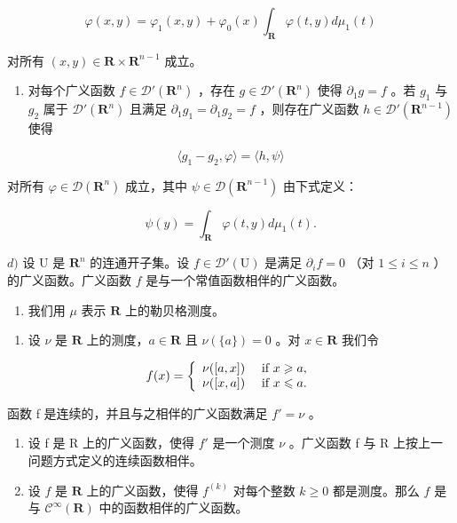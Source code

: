 \[
\varphi (x, y) = \varphi_ {1} (x, y) + \varphi_ {0} (x) \int_ {\mathbf {R}} \varphi (t, y) d \mu_ {1} (t)
\]

对所有 \((x,y)\in \mathbf{R}\times \mathbf{R}^{n - 1}\) 成立。

\begin{enumerate}
\def\labelenumi{\alph{enumi})}
\setcounter{enumi}{2}
\tightlist
\item
  对每个广义函数 \(f \in \mathcal{D}'(\mathbf{R}^{n})\) ，存在 \(g \in \mathcal{D}'(\mathbf{R}^{n})\) 使得 \(\partial_{1}g = f\) 。若 \(g_{1}\) 与 \(g_{2}\) 属于 \(\mathcal{D}'(\mathbf{R}^{n})\) 且满足 \(\partial_{1}g_{1} = \partial_{1}g_{2} = f\) ，则存在广义函数 \(h \in \mathcal{D}'(\mathbf{R}^{n-1})\) 使得
\end{enumerate}

\[
\langle g _ {1} - g _ {2}, \varphi \rangle = \langle h, \psi \rangle
\]

对所有 \(\varphi\in\mathcal{D}(\mathbf{R}^{n})\) 成立，其中 \(\psi\in\mathcal{D}(\mathbf{R}^{n-1})\) 由下式定义：

\[
\psi (y) = \int_ {\mathbf {R}} \varphi (t, y) d \mu_ {1} (t).
\]

\(d)\) 设 U 是 \(\mathbf{R}^{n}\) 的连通开子集。设 \(f \in \mathcal{D}'(\mathrm{U})\) 是满足 \(\partial_{i}f = 0\) （对 \(1 \leqslant i \leqslant n\) ）的广义函数。广义函数 \(f\) 是与一个常值函数相伴的广义函数。

\begin{enumerate}
\def\labelenumi{\arabic{enumi})}
\setcounter{enumi}{3}
\tightlist
\item
  我们用 \(\mu\) 表示 \(\mathbf{R}\) 上的勒贝格测度。
\end{enumerate}

\begin{enumerate}
\def\labelenumi{\alph{enumi})}
\tightlist
\item
  设 \(\nu\) 是 \(\mathbf{R}\) 上的测度，\(a \in \mathbf{R}\) 且 \(\nu(\{a\}) = 0\) 。对 \(x \in \mathbf{R}\) 我们令
\end{enumerate}

\[
f (x) = \left\{ \begin{array}{l l} \nu ([ a, x ]) & \text { if } x \geqslant a, \\ \nu ([ x, a ]) & \text { if } x \leqslant a. \end{array} \right.
\]

函数 f 是连续的，并且与之相伴的广义函数满足 \(f' = \nu\) 。

\begin{enumerate}
\def\labelenumi{\alph{enumi})}
\setcounter{enumi}{1}
\item
  设 f 是 R 上的广义函数，使得 \(f'\) 是一个测度 \(\nu\) 。广义函数 f 与 R 上按上一问题方式定义的连续函数相伴。
\item
  设 \(f\) 是 \(\mathbf{R}\) 上的广义函数，使得 \(f^{(k)}\) 对每个整数 \(k \geqslant 0\) 都是测度。那么 \(f\) 是与 \(\mathcal{C}^{\infty}(\mathbf{R})\) 中的函数相伴的广义函数。
\end{enumerate}

